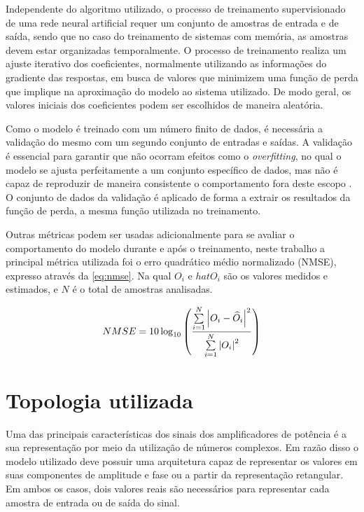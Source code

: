 Independente do algoritmo utilizado, o processo de treinamento supervisionado de uma rede neural artificial requer um conjunto de amostras de entrada e de saída, sendo que no caso do treinamento de sistemas com memória, as amostras devem estar organizadas temporalmente. O processo de treinamento realiza um ajuste iterativo dos coeficientes, normalmente utilizando as informações do gradiente das respostas, em busca de valores que minimizem uma função de perda que implique na aproximação do modelo ao sistema utilizado. De modo geral, os valores iniciais dos coeficientes podem ser escolhidos de maneira aleatória.

Como o modelo é treinado com um número finito de dados, é necessária a validação do mesmo com um segundo conjunto de entradas e saídas. A validação é essencial para garantir que não ocorram efeitos como o \textit{overfitting}, no qual o modelo se ajusta perfeitamente a um conjunto específico de dados, mas não é capaz de reproduzir de maneira consistente o comportamento fora deste escopo \cite{haykin1999neural}. O conjunto de dados da validação é aplicado de forma a extrair os resultados da função de perda, a mesma função utilizada no treinamento.

Outras métricas podem ser usadas adicionalmente para se avaliar o comportamento do modelo durante e após o treinamento, neste trabalho a principal métrica utilizada foi o erro quadrático médio normalizado (NMSE), expresso através da \autoref{eq:nmse}. Na qual $O_i$ e $hat{O}_i$ são os valores medidos e estimados, e $N$ é o total de amostras analisadas. 

\begin{align}
NMSE = 10\log_{10}
\left(
\frac
{\sum\limits_{i=1}^{N}
\abs{O_{i}-\widehat{O}_{i}}^{2}}
{\sum\limits_{i=1}^{N}
\abs{O_{i}}^2}
\right)
\label{eq:nmse}
\end{align}

\section{Topologia utilizada} \label{sec:model-topo}
Uma das principais características dos sinais dos amplificadores de potência é a sua representação por meio da utilização de números complexos. Em razão disso o modelo utilizado deve possuir uma arquitetura capaz de representar os valores em suas componentes de amplitude e fase ou a partir da representação retangular. Em ambos os casos, dois valores reais são necessários para representar cada amostra de entrada ou de saída do sinal.

